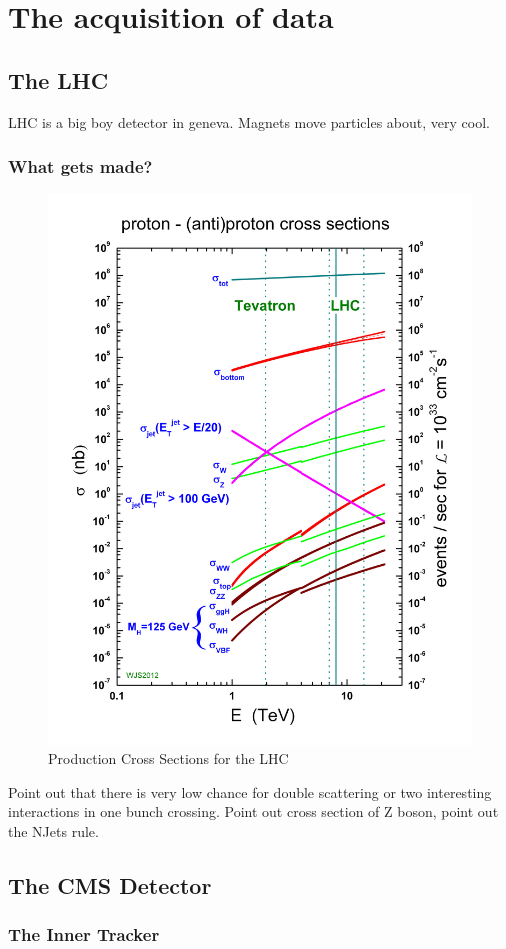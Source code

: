 \chapter{The acquisition of data}

\section{The LHC}
  LHC is a big boy detector in geneva. Magnets move particles about, very cool.  
  \subsection{What gets made?}
  \begin{figure}[h!]
    \centering
    \includegraphics[width=.7\textwidth]{figures/lhc_decay_modes.jpg}
    \caption{Production Cross Sections for the LHC}
    \label{fig:lhc_decay_modes}
  \end{figure}

  Point out that there is very low chance for double scattering or two interesting interactions in one bunch crossing. Point out cross section of Z boson, point out the NJets rule.

\section{The CMS Detector}
  \subsection{The Inner Tracker}
